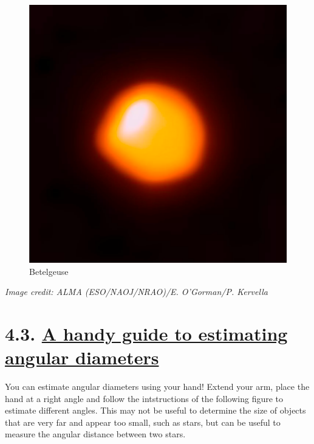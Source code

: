 \documentclass[
  letterpaper,
  DIV=11,
  numbers=noendperiod]{scrreprt}
\begin{document}
\begin{figure}

{\centering \includegraphics{img/Betelgeuse.png}

}

\caption{Betelgeuse}

\end{figure}

\emph{Image credit: ALMA (ESO/NAOJ/NRAO)/E. O'Gorman/P. Kervella}

\hypertarget{a-handy-guide-to-estimating-angular-diameters}{%
\section{\texorpdfstring{4.3. \protect\hyperlink{toc0_}{A handy guide to
estimating angular
diameters}}{4.3. A handy guide to estimating angular diameters}}\label{a-handy-guide-to-estimating-angular-diameters}}

You can estimate angular diameters using your hand! Extend your arm,
place the hand at a right angle and follow the intstructions of the
following figure to estimate different angles. This may not be useful to
determine the size of objects that are very far and appear too small,
such as stars, but can be useful to measure the angular distance between
two stars.
\end{document}
